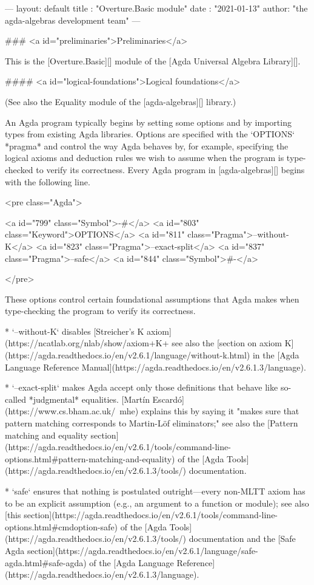 ---
layout: default
title : "Overture.Basic module"
date : "2021-01-13"
author: "the agda-algebras development team"
---

### <a id="preliminaries">Preliminaries</a>

This is the [Overture.Basic][] module of the [Agda Universal Algebra Library][].

#### <a id="logical-foundations">Logical foundations</a>

(See also the Equality module of the [agda-algebras][] library.)

An Agda program typically begins by setting some options and by importing types
from existing Agda libraries. Options are specified with the `OPTIONS` *pragma*
and control the way Agda behaves by, for example, specifying the logical axioms
and deduction rules we wish to assume when the program is type-checked to verify
its correctness. Every Agda program in [agda-algebras][] begins with the following line.

<pre class="Agda">

<a id="799" class="Symbol">{-#</a> <a id="803" class="Keyword">OPTIONS</a> <a id="811" class="Pragma">--without-K</a> <a id="823" class="Pragma">--exact-split</a> <a id="837" class="Pragma">--safe</a> <a id="844" class="Symbol">#-}</a>

</pre>

These options control certain foundational assumptions that Agda makes when
type-checking the program to verify its correctness.

*  `--without-K` disables 
   [Streicher's K axiom](https://ncatlab.org/nlab/show/axiom+K+%
   see also the
   [section on axiom K](https://agda.readthedocs.io/en/v2.6.1/language/without-k.html)
   in the [Agda Language Reference Manual](https://agda.readthedocs.io/en/v2.6.1.3/language).

*  `--exact-split` makes Agda accept only those definitions that behave like so-called
   *judgmental* equalities.  [Martín Escardó](https://www.cs.bham.ac.uk/~mhe) explains
   this by saying it "makes sure that pattern matching corresponds to Martin-Löf
   eliminators;" see also the
   [Pattern matching and equality section](https://agda.readthedocs.io/en/v2.6.1/tools/command-line-options.html#pattern-matching-and-equality)
   of the [Agda Tools](https://agda.readthedocs.io/en/v2.6.1.3/tools/) documentation.

*  `safe` ensures that nothing is postulated outright---every non-MLTT axiom has to be
   an explicit assumption (e.g., an argument to a function or module); see also
   [this section](https://agda.readthedocs.io/en/v2.6.1/tools/command-line-options.html#cmdoption-safe)
   of the [Agda Tools](https://agda.readthedocs.io/en/v2.6.1.3/tools/) documentation and the
   [Safe Agda section](https://agda.readthedocs.io/en/v2.6.1/language/safe-agda.html#safe-agda)
   of the [Agda Language Reference](https://agda.readthedocs.io/en/v2.6.1.3/language).

